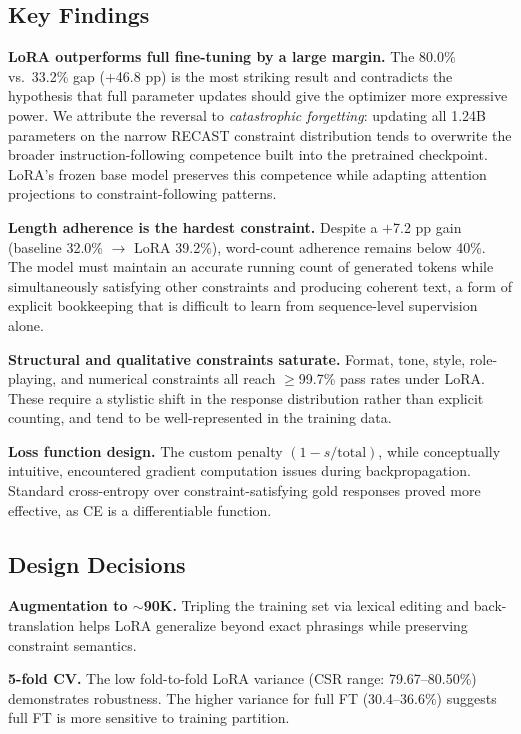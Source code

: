 \documentclass[10pt]{article}
\begin{document}
\subsection{Key Findings}

\textbf{LoRA outperforms full fine-tuning by a large margin.}
The 80.0\% vs.\ 33.2\% gap ($+$46.8 pp) is the most striking result and
contradicts the hypothesis that full parameter updates should give the
optimizer more expressive power. We attribute the reversal to
\textit{catastrophic forgetting}: updating all 1.24B parameters on the
narrow RECAST constraint distribution tends to overwrite the broader
instruction-following competence built into the pretrained checkpoint.
LoRA's frozen base model preserves this competence while adapting attention
projections to constraint-following patterns.

\textbf{Length adherence is the hardest constraint.}
Despite a $+$7.2 pp gain (baseline 32.0\% $\to$ LoRA 39.2\%), word-count
adherence remains below 40\%. The model must maintain an accurate running
count of generated tokens while simultaneously satisfying other constraints
and producing coherent text, a form of explicit bookkeeping that is
difficult to learn from sequence-level supervision alone.

\textbf{Structural and qualitative constraints saturate.}
Format, tone, style, role-playing, and numerical constraints all reach
$\geq$99.7\% pass rates under LoRA. These require a stylistic shift in the
response distribution rather than explicit counting, and tend to be
well-represented in the training data.

\textbf{Loss function design.}
The custom penalty $(1-s/\text{total})$, while conceptually intuitive,
encountered gradient computation issues during backpropagation. Standard
cross-entropy over constraint-satisfying gold responses proved more
effective, as CE is a differentiable function. 

\subsection{Design Decisions}

\textbf{Augmentation to $\sim$90K.} Tripling the training set via lexical
editing and back-translation helps LoRA generalize beyond exact phrasings
while preserving constraint semantics.

\textbf{5-fold CV.} The low fold-to-fold LoRA variance (CSR range:
79.67--80.50\%) demonstrates robustness. The higher variance for full FT
(30.4--36.6\%) suggests full FT is more sensitive to training partition.
\end{document}
